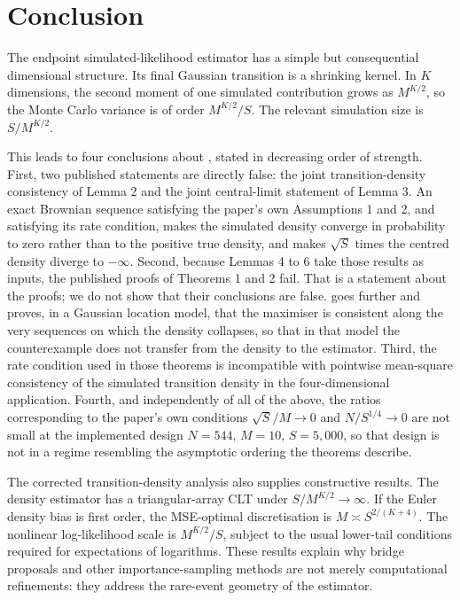 \documentclass[11pt]{article}
\theoremstyle{definition}
\begin{document}
\FloatBarrier
\section{Conclusion}

The endpoint simulated-likelihood estimator has a simple but consequential dimensional structure. Its final Gaussian transition is a shrinking kernel. In $K$ dimensions, the second moment of one simulated contribution grows as $M^{K/2}$, so the Monte Carlo variance is of order $M^{K/2}/S$. The relevant simulation size is $S/M^{K/2}$.

This leads to four conclusions about \citet{BrandtSantaClara2002}, stated in decreasing order of strength. First, two published statements are directly false: the joint transition-density consistency of Lemma 2 and the joint central-limit statement of Lemma 3. An exact Brownian sequence satisfying the paper's own Assumptions 1 and 2, and satisfying its rate condition, makes the simulated density converge in probability to zero rather than to the positive true density, and makes $\sqrt S$ times the centred density diverge to $-\infty$. Second, because Lemmas 4 to 6 take those results as inputs, the published proofs of Theorems 1 and 2 fail. That is a statement about the proofs; we do not show that their conclusions are false.  goes further and proves, in a Gaussian location model, that the maximiser is consistent along the very sequences on which the density collapses, so that in that model the counterexample does not transfer from the density to the estimator. Third, the rate condition used in those theorems is incompatible with pointwise mean-square consistency of the simulated transition density in the four-dimensional application. Fourth, and independently of all of the above, the ratios corresponding to the paper's own conditions $\sqrt S/M\to0$ and $N/S^{1/4}\to0$ are not small at the implemented design $N=544$, $M=10$, $S=5{,}000$, so that design is not in a regime resembling the asymptotic ordering the theorems describe.

The corrected transition-density analysis also supplies constructive results. The density estimator has a triangular-array CLT under $S/M^{K/2}\to\infty$. If the Euler density bias is first order, the MSE-optimal discretisation is $M\asymp S^{2/(K+4)}$. The nonlinear log-likelihood scale is $M^{K/2}/S$, subject to the usual lower-tail conditions required for expectations of logarithms. These results explain why bridge proposals and other importance-sampling methods are not merely computational refinements: they address the rare-event geometry of the estimator.
\end{document}
